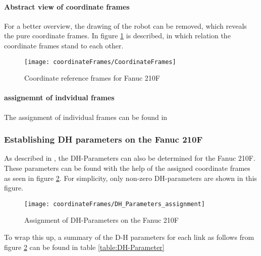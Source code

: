 \paragraph{Abstract view of coordinate frames}
For a better overview, the drawing of the robot can be removed, which reveals the pure coordinate frames. In figure \ref{fig:RefFrameAbstract} is described, in which relation the coordinate frames stand to each other.

\begin{figure}[H]
	\texttt{[image: coordinateFrames/CoordinateFrames]}
	\caption{Coordinate reference frames for Fanuc 210F}
	\label{fig:RefFrameAbstract}
\end{figure}

\paragraph{assignemnt of indvidual frames}
The assignment of individual frames can be found in 





\subsubsection{Establishing \ac{DH} parameters on the Fanuc 210F}

As described in , the \ac{DH}-Parameters can also be determined for the Fanuc 210F.
These parameters can be found with the help of the assigned coordinate frames as seen in figure \ref{fig:DH_Parameters_Fanuc210F}. For simplicity, only non-zero DH-parameters are shown in this figure.

\begin{figure}[H]
	\texttt{[image: coordinateFrames/DH\_Parameters\_assignment]}
	\caption{Assignment of DH-Parameters on the Fanuc 210F}
	\label{fig:DH_Parameters_Fanuc210F}
\end{figure}


To wrap this up, a summary of the D-H parameters for each link as follows from figure \ref{fig:DH_Parameters_Fanuc210F} can be found in table \ref{table:DH-Parameter}




